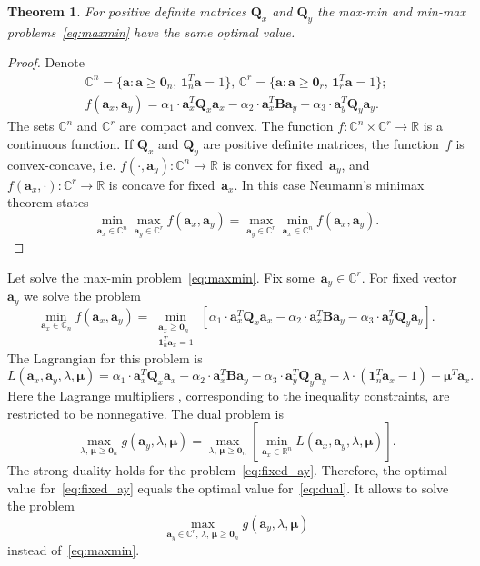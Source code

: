 \documentclass[12pt,twoside]{article}
\newtheorem{theorem}{Theorem}
\newcommand{\ba}{\mathbf{a}}
\newcommand{\bB}{\mathbf{B}}
\newcommand{\bQ}{\mathbf{Q}}
\newcommand{\bbR}{\mathbb{R}}
\newcommand{\bmu}{\boldsymbol{\mu}}
\newcommand{\bOne}{\boldsymbol{1}}
\newcommand{\bZero}{\boldsymbol{0}}
\begin{document}
\begin{theorem}
	For positive definite matrices $\bQ_x$ and $\bQ_y$ the max-min and min-max problems~\eqref{eq:maxmin} have the same optimal value. 
\end{theorem}
\begin{proof}
	Denote 
	\begin{align*}
	\mathbb{C}^n = \{\ba : \ba \geq \bZero_n, \, \bOne_n^T\ba=1\}, \, \mathbb{C}^r = \{\ba : \ba \geq \bZero_r, \, \bOne_r^T\ba=1\}; \\ 
	f(\ba_x, \ba_y) = \alpha_1 \cdot \ba_x^T \bQ_x \ba_x - \alpha_2 \cdot \ba_x^T \bB \ba_y - \alpha_3 \cdot \ba_y^T \bQ_y \ba_y.
	\end{align*}
	The sets $\mathbb{C}^n$ and $\mathbb{C}^r$ are compact and convex. The function $f: \mathbb{C}^n \times \mathbb{C}^r \rightarrow \bbR$ is a continuous function. If $\bQ_x$ and $\bQ_y$ are positive definite matrices, the function~$f$ is convex-concave, i.e.
	$f(\cdot, \ba_y): \mathbb{C}^n \rightarrow \bbR$ is convex for fixed~$\ba_y$, and $f(\ba_x, \cdot): \mathbb{C}^r \rightarrow \bbR$ is concave for fixed~$\ba_x$. 
	In this case Neumann's minimax theorem states
	\[
	\min_{\ba_x \in \mathbb{C}^n} \max_{\ba_y \in \mathbb{C}^r} f(\ba_x, \ba_y) = \max_{\ba_y \in \mathbb{C}^r} \min_{\ba_x\in \mathbb{C}^n} f(\ba_x, \ba_y).
	\]
\end{proof}

Let solve the max-min problem~\eqref{eq:maxmin}. Fix some~$\ba_y \in \mathbb{C}^r$. For fixed vector~$\ba_y$ we solve the problem
\begin{equation}
	\min_{\ba_x \in \mathbb{C}_n} f(\ba_x, \ba_y) = \min_{\substack{\ba_x \geq \bZero_n \\ \bOne_n^T\ba_x=1}} \left[\alpha_1 \cdot \ba_x^T \bQ_x \ba_x - \alpha_2 \cdot \ba_x^T \bB \ba_y - \alpha_3 \cdot \ba_y^T \bQ_y \ba_y \right].
	\label{eq:fixed_ay}
\end{equation}
The Lagrangian for this problem is
\[
	L(\ba_x, \ba_y, \lambda, \bmu) = \alpha_1 \cdot \ba_x^T \bQ_x \ba_x - \alpha_2 \cdot \ba_x^T \bB \ba_y - \alpha_3 \cdot \ba_y^T \bQ_y \ba_y - \lambda \cdot  (\bOne_n^T \ba_x - 1) - \bmu^T \ba_x.
\]
Here the Lagrange multipliers $
$, corresponding to the inequality constraints, are restricted to be nonnegative. 
The dual problem is
\begin{equation}
	\max_{\lambda, \, \bmu \geq \bZero_n} g(\ba_y, \lambda, \bmu) = \max_{\lambda, \, \bmu \geq \bZero_n}  \left[\min_{\ba_x \in \bbR^n} L(\ba_x, \ba_y, \lambda, \bmu) \right].
	\label{eq:dual}
\end{equation}
The strong duality holds for the problem~\eqref{eq:fixed_ay}. Therefore, the optimal value for~\eqref{eq:fixed_ay} equals the optimal value for~\eqref{eq:dual}. It allows to solve the problem
\begin{equation}
	\max_{\ba_y \in \mathbb{C}^r, \, \lambda, \, \bmu \geq \bZero_n} g(\ba_y, \lambda, \bmu)
	\label{eq:dual_maxmin}
\end{equation}
instead of~\eqref{eq:maxmin}.
\end{document}
